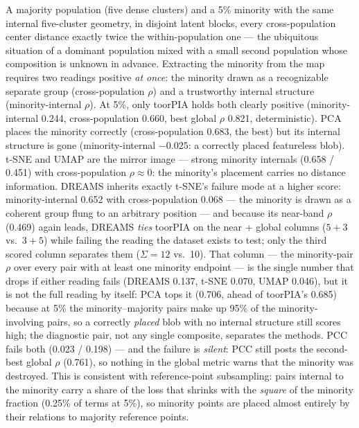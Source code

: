 \documentclass[11pt]{article}
\begin{document}
A majority population (five dense clusters) and a 5\% minority with the same
internal five-cluster geometry, in disjoint latent blocks, every
cross-population center distance exactly twice the within-population one ---
the ubiquitous situation of a dominant population mixed with a small second
population whose composition is unknown in advance. Extracting the minority
from the map requires two readings positive \emph{at once}: the minority drawn
as a recognizable separate group (cross-population $\rho$) and a trustworthy
internal structure (minority-internal $\rho$). At 5\%, only toorPIA holds both
clearly positive (minority-internal 0.244, cross-population 0.660, best global
$\rho$ 0.821, deterministic). PCA places the minority correctly
(cross-population 0.683, the best) but its internal structure is gone
(minority-internal $-0.025$: a correctly placed featureless blob). t-SNE and
UMAP are the mirror image --- strong minority internals (0.658 / 0.451) with
cross-population $\rho \approx 0$: the minority's placement carries no
distance information. DREAMS inherits exactly t-SNE's failure mode at a
higher score: minority-internal 0.652 with cross-population 0.068 --- the
minority is drawn as a coherent group flung to an arbitrary position --- and
because its near-band $\rho$ (0.469) again leads, DREAMS \emph{ties} toorPIA
on the near + global columns ($5{+}3$ vs.\ $3{+}5$) while failing the reading
the dataset exists to test; only the third scored column separates them
($\Sigma{=}12$ vs.\ 10). That column --- the minority-pair $\rho$ over
every pair with at least one minority endpoint --- is the single number that
drops if either reading fails (DREAMS 0.137, t-SNE 0.070, UMAP 0.046), but it
is not the full reading by itself: PCA tops it (0.706, ahead of toorPIA's
0.685) because at 5\% the minority--majority pairs make up 95\% of the
minority-involving pairs, so a correctly \emph{placed} blob with no internal
structure still scores high; the diagnostic pair, not any single composite,
separates the methods. PCC fails both (0.023 / 0.198) --- and the failure is
\emph{silent}: PCC still posts the second-best global $\rho$ (0.761), so
nothing in the global metric warns that the minority was destroyed. This is
consistent with reference-point subsampling: pairs internal to the minority
carry a share of the loss that shrinks with the \emph{square} of the minority
fraction (0.25\% of terms at 5\%), so minority points are placed almost
entirely by their relations to majority reference points.
\end{document}
